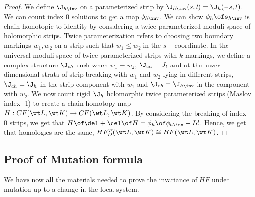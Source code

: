 \begin{proof}
We define $\J_{h\inv}$ on a parameterized strip by $\J_{h\inv}(s,t) = \J_h(-s,t)$. We can count index 0 solutions to get a map $\phi_{h\inv}$. We can show $\phi_h \of \phi_{h\inv}$ is chain homotopic to identity by considering a twice-parameterized moduli space of holomorphic strips. Twice parameterization refers to choosing two boundary markings $w_1,w_2$ on a strip such that $w_1 \leq w_2$ in the $s-$coordinate. In the universal moduli space of twice parameterized  strips with $k$ markings, we define a complex structure $\J_{ch}$ such when $w_1 = w_2$, $\J_{ch} = J_t$ and at the lower dimensional strata of strip breaking with $w_1$ and $w_2$ lying in different strips, $\J_{ch}= \J_h$ in the strip component with $w_1$ and  $\J_{ch}= \J_{h\inv} $ in the component with $w_2$. We now count rigid $\J_h$ holomorphic twice parameterized strips  (Maslov index -1) to create a chain homotopy map $H:CF(\wt L,\wt K) \to CF(\wt L,\wt K) $. By considering the breaking of index 0 strips, we get that $H\of \del + \del \of H=\phi_h \of \phi_{h\inv} - Id$. Hence, we get that homologies are the same, $HF^{\mathcal{P}}_D(\wt L , \wt K) \cong HF(\wt L,\wt K)$.

\end{proof}



\subsection{Proof of Mutation formula}

We have now all the materials needed to prove the invariance of $HF$ under mutation up to a change in the local system. 

